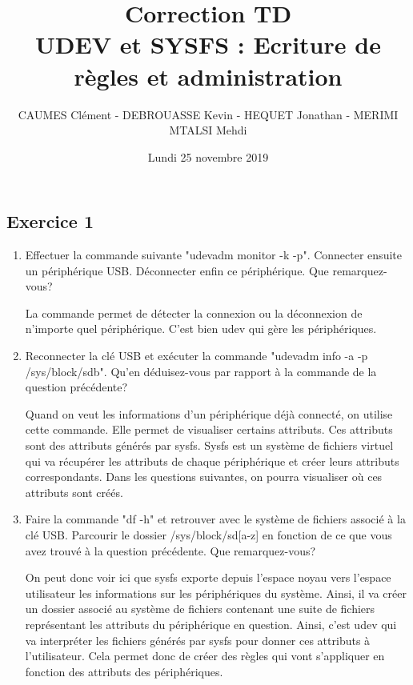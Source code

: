 \documentclass[11pt]{article}
\title{\huge{\textbf {Correction TD} \\UDEV et SYSFS : Ecriture de règles et administration}}
\date{Lundi 25 novembre 2019}
\author{CAUMES Clément - DEBROUASSE Kevin - HEQUET Jonathan - MERIMI MTALSI Mehdi}
\begin{document}
\maketitle

\subsection*{Exercice 1}

\begin{enumerate}
	\item Effectuer la commande suivante "udevadm monitor -k -p". Connecter ensuite un périphérique USB. Déconnecter enfin ce périphérique. Que remarquez-vous? 
	
	 \bigskip 
	
	La commande permet de détecter la connexion ou la déconnexion de n'importe quel périphérique. C'est bien udev qui gère les périphériques.\bigskip
	
	\item Reconnecter la clé USB et exécuter la commande "udevadm info -a -p /sys/block/sdb". Qu'en déduisez-vous par rapport à la commande de la question précédente? 
	
	 \bigskip
	
	Quand on veut les informations d'un périphérique déjà connecté, on utilise cette commande. Elle permet de visualiser certains attributs. 
	Ces attributs sont des attributs générés par sysfs. Sysfs est un système de fichiers virtuel qui va récupérer les attributs de chaque périphérique et créer leurs 
	attributs correspondants. Dans les questions suivantes, on pourra visualiser où ces attributs sont créés.
	
	\item Faire la commande "df -h" et retrouver avec le système de fichiers associé à la clé USB. 
	Parcourir le dossier /sys/block/sd[a-z] en fonction de ce que vous avez trouvé à la question précédente. Que remarquez-vous?
	
	 \bigskip
	
	 \bigskip
	
	On peut donc voir ici que sysfs exporte depuis l'espace noyau vers l'espace utilisateur les informations 
	sur les périphériques du système. Ainsi, il va créer un dossier associé au système de fichiers contenant une 
	suite de fichiers représentant les attributs du périphérique en question. Ainsi, c'est udev qui va 
	interpréter les fichiers générés par sysfs pour donner ces attributs à l'utilisateur. Cela permet donc 
	de créer des règles qui vont s'appliquer en fonction des attributs des périphériques. \newpage
	

\end{enumerate}
\end{document}
